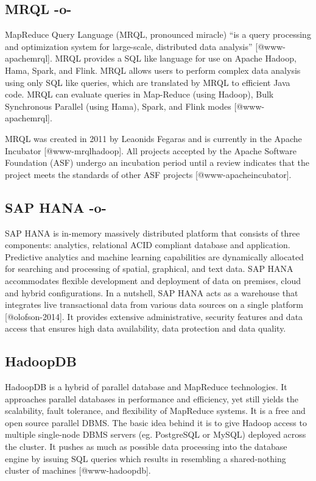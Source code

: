 \subsection{MRQL -o-}

MapReduce Query Language (MRQL, pronounced miracle) ``is a query
processing and optimization system for large-scale, distributed data
analysis'' [@www-apachemrql]. MRQL provides a SQL like language
for use on Apache Hadoop, Hama, Spark, and Flink.  MRQL allows users
to perform complex data analysis using only SQL like queries, which
are translated by MRQL to efficient Java code. MRQL can evaluate
queries in Map-Reduce (using Hadoop), Bulk Synchronous Parallel (using
Hama), Spark, and Flink modes [@www-apachemrql].

MRQL was created in 2011 by Leaonids Fegaras and is currently in the
Apache Incubator [@www-mrqlhadoop].  All projects accepted by the
Apache Software Foundation (ASF) undergo an incubation period until a
review indicates that the project meets the standards of other ASF
projects [@www-apacheincubator].



\subsection{SAP HANA -o-}

SAP HANA is in-memory massively distributed platform that consists of
three components: analytics, relational ACID compliant database and
application\cite{www-sap-hana}. Predictive analytics and machine
learning capabilities are dynamically allocated for searching and
processing of spatial, graphical, and text data.  SAP HANA
accommodates flexible development and deployment of data on premises,
cloud and hybrid configurations.  In a nutshell, SAP HANA acts as a
warehouse that integrates live transactional data from various data
sources on a single platform [@olofson-2014]. It provides
extensive administrative, security features and data access that
ensures high data availability, data protection and data quality.


   

\subsection{HadoopDB}
    
HadoopDB is a hybrid of parallel database and MapReduce
technologies. It approaches parallel databases in performance and
efficiency, yet still yields the scalability, fault tolerance, and
flexibility of MapReduce systems. It is a free and open source
parallel DBMS. The basic idea behind it is to give Hadoop access to
multiple single-node DBMS servers (eg. PostgreSQL or MySQL) deployed
across the cluster. It pushes as much as possible data processing into
the database engine by issuing SQL queries which results in resembling
a shared-nothing cluster of machines [@www-hadoopdb].

